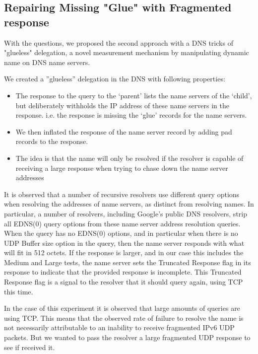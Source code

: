 \subsection{Repairing Missing "Glue" with Fragmented response}


With the questions, we proposed the second approach with a DNS tricks 
of "glueless" delegation, a novel measurement mechanism by manipulating 
dynamic name on DNS name servers. 

We created a ”glueless”	delegation in the DNS with following properties:

\begin{itemize}
  \item The	response to	the	query to the ‘parent’ lists	the	name servers of	
  the	‘child’, but deliberately withholds	the	IP address of these name 
  servers in the response. i.e. the response is missing the ‘glue’ records 
  for the name servers.
  \item We then inflated the response of the name server record by adding 
  pad records to the response.
  \item The	idea is	that the name will only	be resolved	if the resolver 
  is capable of	receiving a large response when	trying to chase	down the 
  name server addresses
\end{itemize}

It is observed that a number of recursive resolvers use different query options 
when resolving the addresses of name servers, as distinct from resolving names. 
In particular, a number of resolvers, including Google’s public DNS resolvers, 
strip all EDNS(0) query options from these name server address resolution 
queries. When the query has no EDNS(0) options, and in particular when there is 
no UDP Buffer size option in the query, then the name server responds with what 
will fit in 512 octets. If the response is larger, and in our case this includes 
the Medium and Large tests, the name server sets the Truncated Response flag in 
its response to indicate that the provided response is incomplete. This Truncated 
Response flag is a signal to the resolver that it should query again, using TCP 
this time. 

In the case of this experiment it is observed that large amounts of queries are using TCP. 
This means that the observed rate of failure to resolve the name is not necessarily 
attributable to an inability to receive fragmented IPv6 UDP packets. But we	wanted to 
pass the resolver a	large fragmented UDP response to see if received it.

